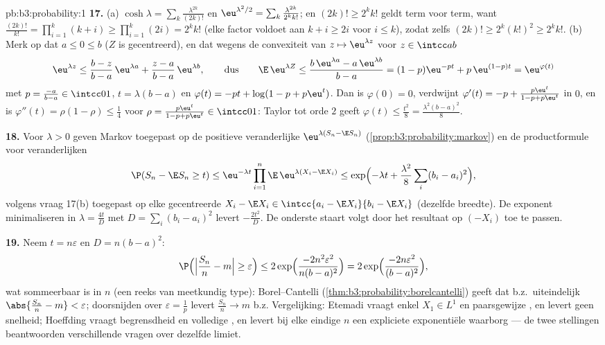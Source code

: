 \begin{solution}{pb:b3:probability:1}
\textbf{17.} (a) $\cosh\lambda = \sum_k\frac{\lambda^{2k}}{(2k)!}$
en $\eu^{\lambda^2/2} = \sum_k\frac{\lambda^{2k}}{2^kk!}$; en
$(2k)! \geq 2^kk!$ geldt term voor term, want $\frac{(2k)!}{k!} =
\prod_{i=1}^k(k + i) \geq \prod_{i=1}^k(2i) = 2^kk!$ (elke factor
voldoet aan $k + i \geq 2i$ voor $i \leq k$), zodat zelfs $(2k)!
\geq 2^k(k!)^2 \geq 2^kk!$. (b) Merk op dat $a \leq 0 \leq b$
($Z$ is gecentreerd), en dat wegens de convexiteit van $z \mapsto
\eu^{\lambda z}$ voor $z \in \intcc ab$
\[
\eu^{\lambda z} \leq \frac{b - z}{b - a}\,\eu^{\lambda a} +
\frac{z - a}{b - a}\,\eu^{\lambda b},
\qquad\text{dus}\qquad
\E\,\eu^{\lambda Z} \leq \frac{b\,\eu^{\lambda a} -
a\,\eu^{\lambda b}}{b - a}
= (1 - p)\eu^{-pt} + p\,\eu^{(1-p)t} = \eu^{\varphi(t)}
\]
met $p = \frac{-a}{b-a} \in \intcc01$, $t = \lambda(b - a)$ en
$\varphi(t) = -pt + \log(1 - p + p\eu^t)$. Dan is $\varphi(0) =
0$, verdwijnt $\varphi'(t) = -p + \frac{p\eu^t}{1 - p + p\eu^t}$
in $0$, en is $\varphi''(t) = \rho(1 - \rho) \leq \frac14$ voor
$\rho = \frac{p\eu^t}{1 - p + p\eu^t} \in \intcc01$: Taylor tot
orde $2$ geeft $\varphi(t) \leq \frac{t^2}8 =
\frac{\lambda^2(b-a)^2}8$.

\textbf{18.} Voor $\lambda > 0$ geven Markov toegepast op de
positieve veranderlijke $\eu^{\lambda(S_n - \E S_n)}$
(\cref{prop:b3:probability:markov}) en de productformule voor
 veranderlijken
\[
\P(S_n - \E S_n \geq t) \leq \eu^{-\lambda
t}\prod_{i=1}^n\E\,\eu^{\lambda(X_i - \E X_i)}
\leq \exp\Bigl(-\lambda t +
\frac{\lambda^2}8\sum_i(b_i - a_i)^2\Bigr),
\]
volgens vraag 17(b) toegepast op elke gecentreerde $X_i - \E X_i
\in \intcc{a_i - \E X_i}{b_i - \E X_i}$ (dezelfde breedte). De
exponent minimaliseren in $\lambda = \frac{4t}{D}$ met $D =
\sum_i(b_i - a_i)^2$ levert $-\frac{2t^2}D$. De onderste staart
volgt door het resultaat op $(-X_i)$ toe te passen.

\textbf{19.} Neem $t = n\varepsilon$ en $D = n(b - a)^2$:
\[
\P\Bigl(\Bigl|\frac{S_n}n - m\Bigr| \geq \varepsilon\Bigr)
\leq 2\exp\Bigl(\frac{-2n^2\varepsilon^2}{n(b-a)^2}\Bigr)
= 2\exp\Bigl(\frac{-2n\varepsilon^2}{(b-a)^2}\Bigr),
\]
wat sommeerbaar is in $n$ (een reeks van meetkundig type):
Borel--Cantelli (\cref{thm:b3:probability:borelcantelli}) geeft
dat b.z.\ uiteindelijk $\abs{\frac{S_n}n - m} < \varepsilon$;
doorsnijden over $\varepsilon = \frac1p$ levert $\frac{S_n}n \to
m$ b.z. Vergelijking: Etemadi vraagt enkel $X_1 \in L^1$ en
paarsgewijze , en levert geen snelheid;
Hoeffding vraagt begrensdheid en volledige , en
levert bij elke eindige $n$ een expliciete exponentiële waarborg
--- de twee stellingen beantwoorden verschillende vragen over
dezelfde limiet.


\end{solution}
